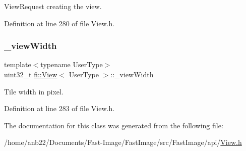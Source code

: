View\+Request creating the view. 



Definition at line 280 of file View.\+h.

\mbox{\label{classfi_1_1View_a44c92ac3b13fbad8e0cc0ae0cca6efc8}} 
\subsubsection{\texorpdfstring{\+\_\+view\+Width}{\_viewWidth}}
{\footnotesize\ttfamily template$<$typename User\+Type$>$ \\
uint32\+\_\+t \hyperlink{classfi_1_1View}{fi\+::\+View}$<$ User\+Type $>$\+::\+\_\+view\+Width\hspace{0.3cm}{\ttfamily [private]}}



Tile width in pixel. 



Definition at line 283 of file View.\+h.



The documentation for this class was generated from the following file\+:\begin{DoxyCompactItemize}
\item 
/home/anb22/\+Documents/\+Fast-\/\+Image/\+Fast\+Image/src/\+Fast\+Image/api/\hyperlink{View_8h}{View.\+h}\end{DoxyCompactItemize}
